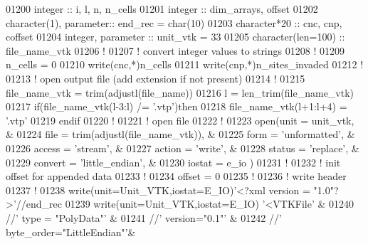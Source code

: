 \begin{DoxyCode}
01200 \textcolor{keywordtype}{integer} :: i, l, n, n\_cells
01201 \textcolor{keywordtype}{integer} :: dim\_arrays, offset
01202 \textcolor{keywordtype}{character(1)}, \textcolor{keywordtype}{parameter}:: end\_rec = char(10)
01203 \textcolor{keywordtype}{character*20} :: cnc, cnp, coffset
01204 \textcolor{keywordtype}{integer}, \textcolor{keywordtype}{parameter} :: unit\_vtk = 33
01205 \textcolor{keywordtype}{character(len=100)} :: file\_name\_vtk
01206 \textcolor{comment}{!}
01207 \textcolor{comment}{! convert integer values to strings}
01208 \textcolor{comment}{!}
01209 n\_cells = 0
01210 \textcolor{keyword}{write}(cnc,*)n\_cells
01211 \textcolor{keyword}{write}(cnp,*)n\_sites\_invaded
01212 \textcolor{comment}{!}
01213 \textcolor{comment}{! open output file (add extension if not present)}
01214 \textcolor{comment}{!}
01215 file\_name\_vtk = trim(adjustl(file\_name))
01216 l = len\_trim(file\_name\_vtk)
01217 \textcolor{keyword}{if}(file\_name\_vtk(l-3:l) /= \textcolor{stringliteral}{'.vtp'})\textcolor{keyword}{then}
01218    file\_name\_vtk(l+1:l+4) = \textcolor{stringliteral}{'.vtp'}
01219 \textcolor{keyword}{endif}
01220 \textcolor{comment}{!}
01221 \textcolor{comment}{! open file}
01222 \textcolor{comment}{!}
01223 \textcolor{keyword}{open}(unit       = unit\_vtk,                     &
01224      file       = trim(adjustl(file\_name\_vtk)), &
01225      form       = \textcolor{stringliteral}{'unformatted'},                &
01226      access     = \textcolor{stringliteral}{'stream'},                     &
01227      action     = \textcolor{stringliteral}{'write'},                      &
01228      status     = \textcolor{stringliteral}{'replace'},                    &
01229      convert    = \textcolor{stringliteral}{'little\_endian'},              &
01230      iostat     = e\_io                          )
01231 \textcolor{comment}{!}
01232 \textcolor{comment}{! init offset for appended data}
01233 \textcolor{comment}{!}
01234 offset = 0
01235 \textcolor{comment}{!}
01236 \textcolor{comment}{! write header}
01237 \textcolor{comment}{!}
01238 \textcolor{keyword}{write}(unit=Unit\_VTK,iostat=E\_IO)\textcolor{stringliteral}{'<?xml version = "1.0"?>'}//end\_rec
01239 \textcolor{keyword}{write}(unit=Unit\_VTK,iostat=E\_IO)  \textcolor{stringliteral}{'<VTKFile'}                  &
01240                                 //\textcolor{stringliteral}{' type = "PolyData"'}        &
01241                                 //\textcolor{stringliteral}{' version="0.1"'}            &
01242                                 //\textcolor{stringliteral}{' byte\_order="LittleEndian"'}&

\end{DoxyCode}
